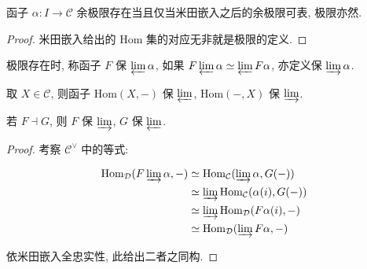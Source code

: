 \begin{lemma}
    函子 \(\alpha : I \to \mathcal{C}\) 余极限存在当且仅当米田嵌入之后的余极限可表, 极限亦然.

    \begin{proof}
        米田嵌入给出的 \(\mathrm{Hom}\) 集的对应无非就是极限的定义.
    \end{proof}
\end{lemma}

\begin{definition}
    极限存在时, 称函子 \(F\) 保 \(\varprojlim \alpha\), 如果 \(F \varprojlim \alpha \simeq \varprojlim F \alpha\), 亦定义保 \(\varinjlim \alpha\).
\end{definition}

\begin{corollary}
    取 \(X \in \mathcal{C}\), 则函子 \(\mathrm{Hom} (X,-)\) 保 \(\varprojlim\), \(\mathrm{Hom} (-,X)\) 保 \(\varinjlim\).
\end{corollary}

\begin{theorem}
    若 \(F \dashv G\), 则 \(F\) 保 \(\varinjlim\), \(G\) 保 \(\varprojlim\).

    \begin{proof}
        考察 \(\mathcal{C}^{\vee}\) 中的等式:

        \[
            \begin{aligned}
                \mathrm{Hom}_{\mathcal{D}} (F \varinjlim \alpha, -) & \simeq \mathrm{Hom}_\mathcal{C} (\varinjlim \alpha, G (-)) \\
                & \simeq \varinjlim \mathrm{Hom}_\mathcal{C} (\alpha (i), G (-)) \\
                & \simeq \varinjlim \mathrm{Hom}_\mathcal{D} (F \alpha (i), -) \\
                & \simeq \mathrm{Hom}_\mathcal{D} (\varinjlim F \alpha, -)
            \end{aligned}
        \]

        依米田嵌入全忠实性, 此给出二者之同构.
    \end{proof}
\end{theorem}
